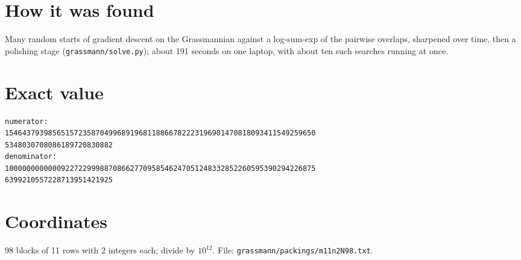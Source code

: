 \documentclass[11pt,a4paper]{article}
\begin{document}
\section{How it was found}
Many random starts of gradient descent on the Grassmannian against a log-sum-exp of the pairwise overlaps, sharpened over time, then a polishing stage (\texttt{grassmann/solve.py}); about 191 seconds on one laptop, with about ten such searches running at once.


\appendix
\section{Exact value}
{\small
\begin{verbatim}
numerator:
154643793985651572358704996891968118866782223196901470818093411549259650
5348030708086189720830882
denominator:
100000000000092272299988708662770958546247051248332852260595390294226875
6399210557228713951421925
\end{verbatim}}

\section{Coordinates}
98 blocks of 11 rows with 2 integers each; divide by $10^{12}$. File: \texttt{grassmann/packings/m11n2N98.txt}.
{\tiny
\begin{multicols}{4}
\end{multicols}}
\end{document}
